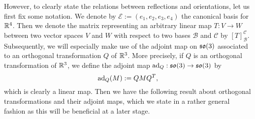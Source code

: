 %
%
However, to clearly state the relations between reflections and orientations, let us first fix some notation. We denote by $\mathcal{E} := (e_1, e_2, e_3, e_4)$ the canonical basis for $\mathbb{R}^4$. Then we denote the matrix representing an arbitrary linear map $T: V \to W$ between two vector spaces $V$ and $W$ with respect to two bases $\mathcal{B}$ and $\mathcal{C}$ by $[T]_{\mathcal{B}}^{\mathcal{C}}$. Subsequently, we will especially make use of the adjoint map on $\mathfrak{so}(3)$ associated to an orthogonal transformation $Q$ of $\mathbb{R}^3$. More precisely, if $Q$ is an orthogonal transformation of $\mathbb{R}^3$, we define the adjoint map $\operatorname{ad}_Q : \mathfrak{so}(3) \to \mathfrak{so}(3)$ by
\begin{equation}
\operatorname{ad}_Q(M) := Q M Q^T,
\end{equation}
which is clearly a linear map. Then we have the following result about orthogonal transformations and their adjoint maps, which we state in a rather general fashion as this will be beneficial at a later stage.

